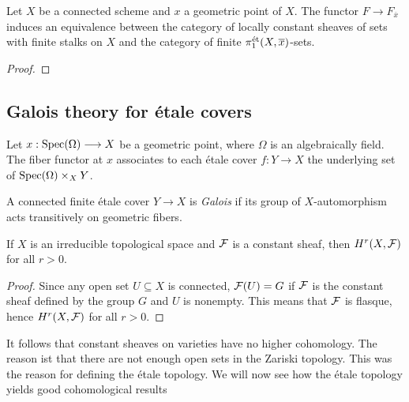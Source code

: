 \begin{proposition}
	Let $X$ be a connected scheme and $x$ a geometric point of $X$. The functor $F \to F_{\overline{x}}$ induces an equivalence between the category of locally constant sheaves of sets with finite stalks on $X$ and the category of finite $\pi_1^{\text{\'et}}(X,\overline{x})$-sets.
\end{proposition}
\begin{proof}

\end{proof}

\subsection{Galois theory for \'etale covers}
\begin{definition}
	Let $x: \operatorname{Spec}(\Omega) \longrightarrow X$ be a geometric point, where $\Omega$ is an algebraically field. The fiber functor at $x$ associates to each \'etale cover $f: Y \to X$ the underlying set of $\operatorname{Spec}(\Omega) \times_X Y$.
\end{definition}

\begin{definition}
	A connected finite \'etale cover $Y \to X$ is \textit{Galois} if its group of $X$-automorphism acts transitively on geometric fibers.
\end{definition}

\begin{theorem}
	If $X$ is an irreducible topological space and $\mathcal{F}$ is a constant sheaf, then $H^r(X, \mathcal{F})$ for all $r>0$.
\end{theorem}
\begin{proof}
	Since any open set $U \subseteq X$ is connected, $\mathcal{F}(U) = G$ if $\mathcal{F}$ is the constant sheaf defined by the group $G$ and $U$ is nonempty. This means that $\mathcal{F}$ is flasque, hence $H^r(X, \mathcal{F})$ for all $r>0$.
\end{proof}
It follows that constant sheaves on varieties have no higher cohomology. The reason ist that there are not enough open sets in the Zariski topology. This was the reason for defining the \'etale topology. We will now see how the \'etale topology yields good cohomological results

